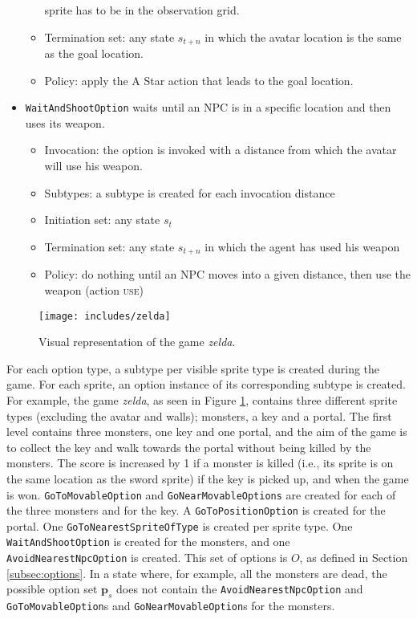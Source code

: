 \begin{itemize}
\begin{itemize}
				sprite has to be in the observation grid.
			\item Termination set: any state $s_{t+n}$ in which the avatar
				location is the same as the goal location.
			\item Policy: apply the A Star action that leads to the goal
				location.
		\end{itemize}
	\item \texttt{WaitAndShootOption} waits until an NPC is in a specific location and
		then uses its weapon.
		\begin{itemize}
			\item Invocation: the option is invoked with a distance from which
				the avatar will use his weapon.
			\item Subtypes: a subtype is created for each invocation distance
			\item Initiation set: any state $s_t$
			\item Termination set: any state $s_{t+n}$ in which the agent has
				used his weapon
			\item Policy: do nothing until an NPC moves into a given distance,
				then use the weapon (action \textsc{use})
		\end{itemize}
\end{itemize}

\begin{figure}
	\centering
	\texttt{[image: includes/zelda]}
	\caption{Visual representation of the game \textit{zelda}.}
	\label{fig:zelda}
\end{figure}

For each option type, a subtype per visible sprite type is created during the
game. For each sprite, an option instance of its corresponding subtype is
created. For example, the game \textit{zelda}, as seen in Figure \ref{fig:zelda},
contains three different sprite types (excluding the avatar and walls);
monsters, a key and a portal. The first level contains three monsters, one key
and one portal, and the aim of the game is to collect the key and walk towards
the portal without being killed by the monsters. The score is increased by 1 if
a monster is killed (i.e., its sprite is on the same location as the sword
sprite) if the key is picked up, and when the game is won.
\texttt{GoToMovableOption} and \texttt{GoNearMovableOptions} are created for
each of the three monsters and for the key. A \texttt{GoToPositionOption} is
created for the portal.  One \texttt{GoToNearestSpriteOfType} is created per
sprite type. One \texttt{WaitAndShootOption} is created for the monsters, and
one \texttt{AvoidNearestNpc\-Option} is created. This set of options is $O$, as
defined in Section \ref{subsec:options}. In a state where, for example, all the
monsters are dead, the possible option set $\mathbf{p}_s$ does not contain the
\texttt{AvoidNearestNpcOption} and \texttt{GoToMovableOption}s and
\texttt{GoNearMovableOption}s for the monsters.

